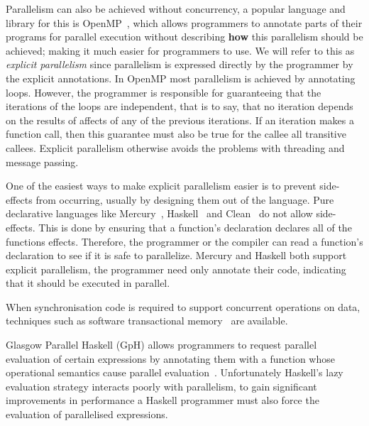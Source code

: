 Parallelism can also be achieved without concurrency,
a popular language and library for this is OpenMP~\cite{openmp},
which allows programmers to annotate parts of their programs for parallel
execution without describing \textbf{how} this parallelism should be achieved;
making it much easier for programmers to use.
We will refer to this as \emph{explicit parallelism}
since parallelism is expressed directly by the programmer by the explicit
annotations.
In OpenMP most parallelism is achieved by annotating loops.
However,
the programmer is responsible for guaranteeing that the iterations of the loops
are independent,
that is to say, that no iteration depends on the results of affects of any of
the previous iterations.
If an iteration makes a function call, then this guarantee must also be true for
the callee all transitive callees.
Explicit parallelism otherwise avoids the problems with threading and message
passing.

One of the easiest ways to make explicit parallelism easier is to prevent
side-effects from occurring, usually by designing them out of the language.
Pure declarative languages like Mercury~\cite{mercury-jlp},
Haskell~\cite{haskell98} and Clean~\cite{1991:concurrent-clean} do not
allow side-effects.
This is done by ensuring that a function's declaration declares all of the
functions effects.
Therefore,
the programmer or the compiler can read a function's declaration to see if it
is safe to parallelize.
Mercury and Haskell both support explicit parallelism,
the programmer need only annotate their code, indicating that it should be
executed in parallel.

When synchronisation code is required to support concurrent operations
on data, techniques such as software transactional
memory~\cite{harris_marlow_spj:haskell-stm, mika:mercury-stm} are
available.

Glasgow Parallel Haskell (GpH) allows programmers to request parallel
evaluation of certain expressions by annotating them with a function
whose operational semantics cause parallel
evaluation~\cite{gph,trinder:1998:strategies,loidi:2008:gph-semiexplicit-parallelism}.
Unfortunately Haskell's lazy evaluation strategy interacts poorly with
parallelism, to gain significant improvements in performance a Haskell
programmer must also force the evaluation of parallelised expressions.

